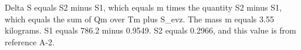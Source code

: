 Delta S equals S2 minus S1, which equals m times the quantity S2 minus S1, which equals the sum of Qm over Tm plus S_evz. The mass m equals 3.55 kilograms. S1 equals 786.2 minus 0.9549. S2 equals 0.2966, and this value is from reference A-2.